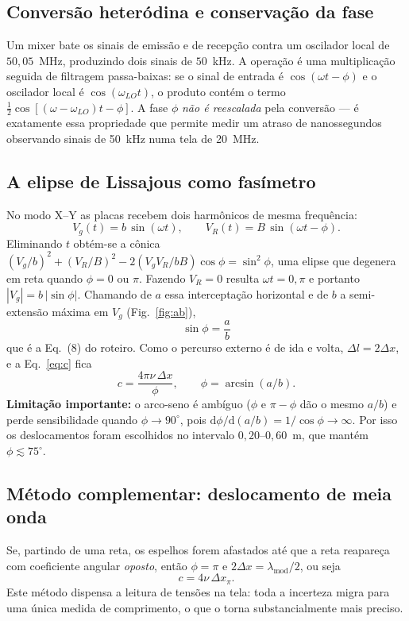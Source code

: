 \documentclass[11pt,a4paper]{article}
\begin{document}
\subsection{Conversão heteródina e conservação da fase}
Um mixer bate os sinais de emissão e de recepção contra um oscilador local de
$50{,}05$~MHz, produzindo dois sinais de $50$~kHz. A operação é uma
multiplicação seguida de filtragem passa-baixas: se o sinal de entrada é
$\cos(\omega t - \phi)$ e o oscilador local é $\cos(\omega_{LO}t)$, o produto
contém o termo $\tfrac12\cos[(\omega-\omega_{LO})t - \phi]$. A fase $\phi$
\emph{não é reescalada} pela conversão --- é exatamente essa propriedade que
permite medir um atraso de nanossegundos observando sinais de 50~kHz numa tela
de 20~MHz.

\subsection{A elipse de Lissajous como fasímetro}
No modo X--Y as placas recebem dois harmônicos de mesma frequência:
\begin{equation}
V_g(t) = b\,\sin(\omega t), \qquad V_R(t) = B\,\sin(\omega t - \phi).
\end{equation}
Eliminando $t$ obtém-se a cônica
$\left(V_g/b\right)^2 + \left(V_R/B\right)^2
- 2\left(V_g V_R / bB\right)\cos\phi = \sin^2\phi$, uma elipse que degenera
em reta quando $\phi = 0$ ou $\pi$. Fazendo $V_R = 0$ resulta
$\omega t = 0,\pi$ e portanto $|V_g| = b\,|\sin\phi|$. Chamando de $a$ essa
interceptação horizontal e de $b$ a semi-extensão máxima em $V_g$
(Fig.~\ref{fig:ab}),
\begin{equation}
\boxed{\;\sin\phi = \frac{a}{b}\;}
\label{eq:sinphi}
\end{equation}
que é a Eq.~(8) do roteiro. Como o percurso externo é de ida e volta,
$\Delta l = 2\Delta x$, e a Eq.~\eqref{eq:c} fica
\begin{equation}
c = \frac{4\pi\nu\,\Delta x}{\phi}, \qquad \phi = \arcsin(a/b).
\label{eq:celipse}
\end{equation}
\textbf{Limitação importante:} o arco-seno é ambíguo ($\phi$ e $\pi-\phi$ dão o
mesmo $a/b$) e perde sensibilidade quando $\phi\to90^\circ$, pois
$\mathrm{d}\phi/\mathrm{d}(a/b) = 1/\cos\phi \to \infty$. Por isso os
deslocamentos foram escolhidos no intervalo $0{,}20$--$0{,}60$~m, que mantém
$\phi \lesssim 75^\circ$.

\subsection{Método complementar: deslocamento de meia onda}
Se, partindo de uma reta, os espelhos forem afastados até que a reta reapareça
com coeficiente angular \emph{oposto}, então $\phi = \pi$ e
$2\Delta x = \lambda_{\text{mod}}/2$, ou seja
\begin{equation}
c = 4\nu\,\Delta x_\pi .
\label{eq:pi}
\end{equation}
Este método dispensa a leitura de tensões na tela: toda a incerteza migra para
uma única medida de comprimento, o que o torna substancialmente mais preciso.
\end{document}
